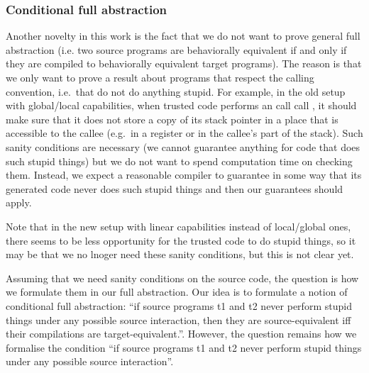 \documentclass[a4paper]{article}
\newcommand{\sourcecolor}[1]{\color{blue}}
\newcommand{\src}[1]{{\sourcecolor{} #1}}
\newcommand{\zinstr}[1]{#1}
\newcommand{\twoinstr}[3]{
  \ifthenelse{\equal{#2#3}{}}
  {\zinstr{#1}}
  {\zinstr{#1} \; #2 \; #3}
}
\newcommand{\scall}[2]{\twoinstr{\src{call}}{#1}{#2}}
\begin{document}
\subsubsection{Conditional full abstraction}
\label{sec:conditional-full-abstraction}

Another novelty in this work is the fact that we do not want to prove general full abstraction (i.e. two source programs are behaviorally equivalent if and only if they are compiled to behaviorally equivalent target programs).
The reason is that we only want to prove a result about programs that respect the calling convention, i.e.\ that do not do anything stupid.
For example, in the old setup with global/local capabilities, when trusted code performs an \scall{}{}, it should make sure that it does not store a copy of its stack pointer in a place that is accessible to the callee (e.g.\ in a register or in the callee's part of the stack).
Such sanity conditions are necessary (we cannot guarantee anything for code that does such stupid things) but we do not want to spend computation time on checking them.
Instead, we expect a reasonable compiler to guarantee in some way that its generated code never does such stupid things and then our guarantees should apply.

Note that in the new setup with linear capabilities instead of local/global ones, there seems to be less opportunity for the trusted code to do stupid things, so it may be that we no lnoger need these sanity conditions, but this is not clear yet.

Assuming that we need sanity conditions on the source code, the question is how we formulate them in our full abstraction.
Our idea is to formulate a notion of conditional full abstraction: ``if source programs t1 and t2 never perform stupid things under any possible source interaction, then they are source-equivalent iff their compilations are target-equivalent.''.
However, the question remains how we formalise the condition ``if source programs t1 and t2 never perform stupid things under any possible source interaction''.
\end{document}
